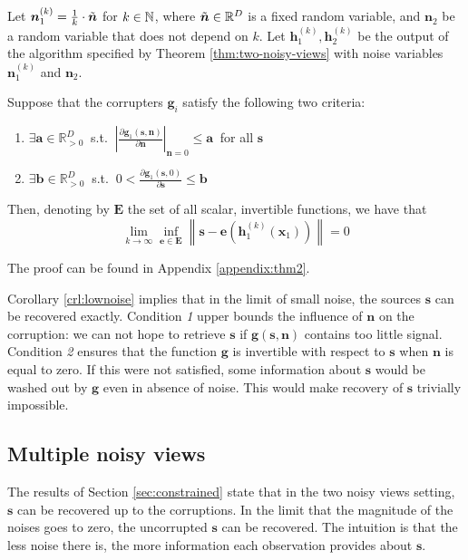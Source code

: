 \medskip

\begin{corollary}
	\label{crl:lownoise}
	Let $\bm{n}_1^{(k)} = \frac{1}{k} \cdot  \Tilde{\bm{n}}$ for $k \in \mathbb{N}$, where $\Tilde{\bm{n}}\in\mathbb{R}^D$ is a fixed random variable, and $\bm{n}_2$ be a random variable that does not depend on $k$.
	Let $\bm{h}_1^{(k)}, \bm{h}_2^{(k)}$ be the output of the algorithm specified by Theorem \ref{thm:two-noisy-views} with noise variables $\bm{n}_1^{(k)}$ and $\bm{n}_2$.
	
	Suppose that the corrupters $\bm{g}_i$ satisfy the following two criteria:
	\begin{enumerate}
		\item $\exists \bm{a}  \in \mathbb{R}_{> 0}^D \: $   s.t. $\: \left|\frac{\partial \bm{g}_1(\bm{s},\bm{n})}{\partial \bm{n}} \right|_{\bm{n}=0} \leq \bm{a} \: $ for all $\bm{s}$
		\item $\exists \bm{b}  \in \mathbb{R}_{> 0}^D \: $ s.t. $\: 0<\frac{\partial \bm{g}_1(\bm{s},0)}{\partial \bm{s}} \leq \bm{b}$
	\end{enumerate}
	Then, denoting by $\bm{E}$ the set of all scalar, invertible functions, we have that
	\[
	\lim_{k \to \infty} \inf_{\bm{e}\in \bm{E}} \left \|\bm{s} - \bm{e}(\bm{h}_1^{(k)}(\bm{x}_1)) \right \| = 0
	\]
\end{corollary}
The proof can be found in Appendix \ref{appendix:thm2}.

Corollary \ref{crl:lownoise} implies that in the limit of small noise, the sources $\bm{s}$ can be recovered exactly.
Condition \textit{1} upper bounds the influence of $\bm{n}$ on the corruption: we can not hope to retrieve $\bm{s}$ if $\bm{g}(\bm{s}, \bm{n})$ contains too little signal.
Condition \textit{2} ensures that the function $\bm{g}$ is invertible with respect to $\bm{s}$ when $\bm{n}$ is equal to zero.
If this were not satisfied, some information about $\bm{s}$ would be washed out by $\bm{g}$ even in absence of noise.
This would make recovery of $\bm{s}$ trivially impossible.


\subsection{Multiple noisy views}
\label{sec:multiple}

The results of Section \ref{sec:constrained} state that in the two noisy views setting, $\bm{s}$ can be recovered up to the corruptions.
In the limit that the magnitude of the noises goes to zero, the uncorrupted $\bm{s}$ can be recovered.
The intuition is that the less noise there is, the more information each observation provides about $\bm{s}$.

